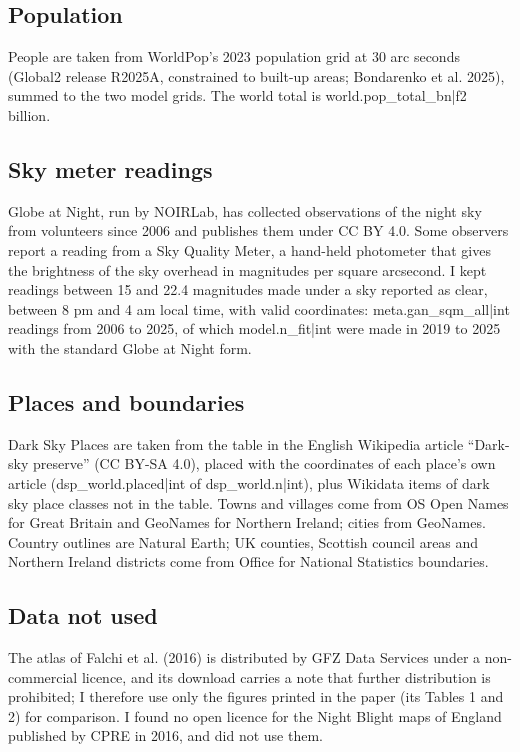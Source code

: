 \documentclass[11pt,a4paper]{article}
\begin{document}
\subsection{Population}
People are taken from WorldPop's 2023 population grid at 30 arc seconds (Global2 release R2025A, constrained to built-up areas; Bondarenko et al. 2025), summed to the two model grids. The world total is {{world.pop_total_bn|f2}} billion.

\subsection{Sky meter readings}
Globe at Night, run by NOIRLab, has collected observations of the night sky from volunteers since 2006 and publishes them under CC BY 4.0. Some observers report a reading from a Sky Quality Meter, a hand-held photometer that gives the brightness of the sky overhead in magnitudes per square arcsecond. I kept readings between 15 and 22.4 magnitudes made under a sky reported as clear, between 8 pm and 4 am local time, with valid coordinates: {{meta.gan_sqm_all|int}} readings from 2006 to 2025, of which {{model.n_fit|int}} were made in 2019 to 2025 with the standard Globe at Night form.

\subsection{Places and boundaries}
Dark Sky Places are taken from the table in the English Wikipedia article ``Dark-sky preserve'' (CC BY-SA 4.0), placed with the coordinates of each place's own article ({{dsp_world.placed|int}} of {{dsp_world.n|int}}), plus Wikidata items of dark sky place classes not in the table. Towns and villages come from OS Open Names for Great Britain and GeoNames for Northern Ireland; cities from GeoNames. Country outlines are Natural Earth; UK counties, Scottish council areas and Northern Ireland districts come from Office for National Statistics boundaries.

\subsection{Data not used}
The atlas of Falchi et al. (2016) is distributed by GFZ Data Services under a non-commercial licence, and its download carries a note that further distribution is prohibited; I therefore use only the figures printed in the paper (its Tables 1 and 2) for comparison. I found no open licence for the Night Blight maps of England published by CPRE in 2016, and did not use them.
\end{document}
